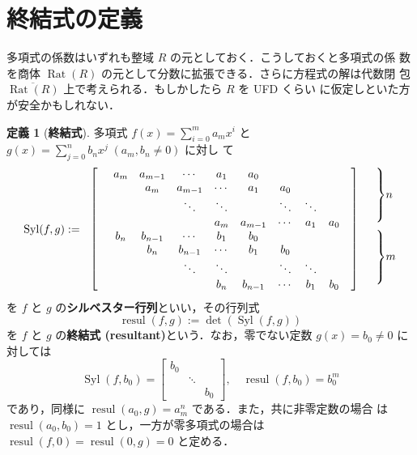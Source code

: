 \documentclass[12pt, uplatex, dvipdfmx]{jsarticle}
\newcommand{\ds}{\displaystyle}
\theoremstyle{definition}
\newtheorem*{definition}{定義}
\DeclareMathOperator{\Syl}{Syl}
\DeclareMathOperator{\resul}{resul}
\DeclareMathOperator{\Rat}{Rat}
\begin{document}
\section{終結式の定義}

多項式の係数はいずれも整域 $R$ の元としておく．こうしておくと多項式の係
数を商体 $\Rat(R)$ の元として分数に拡張できる．さらに方程式の解は代数閉
包 $\overline{\Rat(R)}$ 上で考えられる．もしかしたら $R$ を UFD くらい
に仮定しといた方が安全かもしれない．


\begin{definition}[\textbf{終結式}]
  多項式 $\ds f(x) = \sum_{i=0}^{m}a_m x^i$ と $\ds g(x) = \sum_{j=0}^{n} b_n x^j \; (a_m, b_n \neq 0)$ に対し
  て
  \[
    \Syl(f,g):=
    \begin{array}{rccccccccll}
      \ldelim[{9}{12pt}[] &  a_m & a_{m-1} & \cdots & a_1 & a_0 & & & & \rdelim]{9}{12pt}[] & \rdelim\}{4}{14pt}[\(n\)]\\
                          &  & a_m & a_{m-1} & \cdots & a_1 & a_0& & & &\\
                          &  & & \ddots & \ddots & & \ddots & \ddots & & & \\
                          &  & & & a_m & a_{m-1} & \cdots & a_1 & a_0 & &\\
                          & b_n & b_{n-1} & \cdots & b_1 & b_0 & & & & &  \rdelim\}{4}{14pt}[\(m\)]\\
                          & & b_n & b_{n-1} & \cdots & b_1 & b_0 & & & & \\
                          & & & \ddots & \ddots & & \ddots & \ddots & & &\\
                          & & & & b_n & b_{n-1} & \cdots & b_1 & b_0 & &
    \end{array}
  \]
  を $f$ と $g$ の\textbf{シルベスター行列}といい，その行列式
  \[
    \resul(f,g):= \det(\Syl(f,g))
  \]
  を $f$ と $g$ の\textbf{終結式 (resultant)}という．なお，零でない定数 $g(x) = b_0 \neq 0$ に対しては
  \[
    \Syl(f, b_0) =\left[
    \begin{array}{ccc}
       b_0  & & \\
            & \ddots & \\
            & & b_0 
    \end{array}
  \right], \quad \resul(f, b_0) = b_0^m
  \]
  であり，同様に $\resul(a_0, g) = a_m^n$ である．また，共に非零定数の場合
  は $\resul(a_0, b_0)=1$ とし，一方が零多項式の場合は $\resul(f,0) =
  \resul(0,g)=0$ と定める．
\end{definition}
\end{document}
